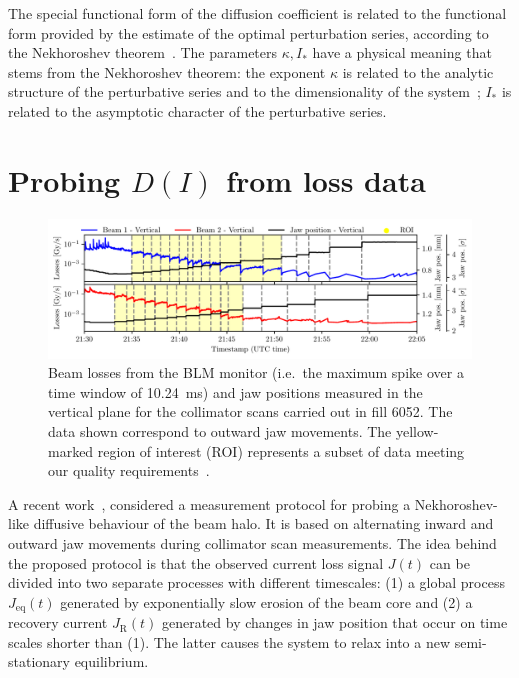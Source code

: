 The special functional form of the diffusion coefficient is related to the functional form provided by the estimate of the optimal perturbation series, according to the Nekhoroshev theorem~\cite{Turchetti:1990aa,Bazzani:1990aa}. The parameters $\kappa, I_\ast$ have a physical meaning that stems from the Nekhoroshev theorem: the exponent $\kappa$ is related to the analytic structure of the perturbative series and to the dimensionality of the system~\cite{bazzani2020diffusion}; $I_\ast$ is related to the asymptotic character of the perturbative series.
%
\section{Probing $D(I)$ from loss data}
%
\begin{figure}[t]
    \centering
    \includegraphics[trim={0 2.5mm 0 4mm}, clip, width=\textwidth]{5_Diffusion_measurement_LHC/figs/first.pdf}
    \caption{Beam losses from the BLM monitor (i.e.\ the maximum spike over a time window of \SI{10.24}{ms}) and jaw positions measured in the vertical plane for the collimator scans carried out in fill 6052. The data shown correspond to outward jaw movements. The yellow-marked region of interest (ROI) represents a subset of data meeting our quality requirements~\cite{PhysRevAccelBeams.23.044802}.}
    \label{fig:first}
\end{figure}

A recent work~\cite{our_paper9}, considered a measurement protocol for probing a Nekhoroshev-like diffusive behaviour of the beam halo. It is based on alternating inward and outward jaw movements during collimator scan measurements. The idea behind the proposed protocol is that the observed current loss signal $J(t)$ can be divided into two separate processes with different timescales: (1) a global process $J_\text{eq}(t)$ generated by exponentially slow erosion of the beam core and (2) a recovery current $J_\mathrm{R}(t)$ generated by changes in jaw position that occur on time scales shorter than (1). The latter causes the system to relax into a new semi-stationary equilibrium.

